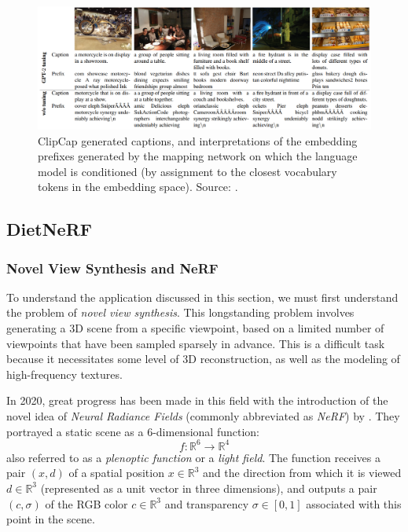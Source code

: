 \documentclass{article}
\begin{document}
\begin{figure}[ht!]
    \begin{center}
        \includegraphics[width=1.0\textwidth]{figures/clipcap_interpretations.png}
    \end{center}
    \caption{
        ClipCap generated captions, and interpretations of the embedding prefixes generated by the mapping network on which the language model is conditioned (by assignment to the closest vocabulary tokens in the embedding space). Source: \citet{mokady2021clipcap}.
    }
    \label{fig:clipcap_interpretations}
\end{figure}



\subsection{DietNeRF}
\label{sec:dietnerf}

\subsubsection{Novel View Synthesis and NeRF}
\label{subsec:nerf}

To understand the application discussed in this section, we must first understand the problem of \emph{novel view synthesis}. This longstanding problem involves generating a 3D scene from a specific viewpoint, based on a limited number of viewpoints that have been sampled sparsely in advance. This is a difficult task because it necessitates some level of 3D reconstruction, as well as the modeling of high-frequency textures.

\medskip
\noindent
In 2020, great progress has been made in this field with the introduction of the novel idea of \emph{Neural Radiance Fields} (commonly abbreviated as \emph{NeRF}) by \citet{mildenhall2020nerf}. They portrayed a static scene as a 6-dimensional function:
\begin{equation*}
    f: \mathbb{R}^6 \rightarrow \mathbb{R}^4
\end{equation*}
also referred to as a \emph{plenoptic function} or a \emph{light field}. The function receives a pair $(x,d)$ of a spatial position $x \in \mathbb{R}^3$ and the direction from which it is viewed $d \in \mathbb{R}^3$ (represented as a unit vector in three dimensions), and outputs a pair $(c,\sigma)$ of the RGB color $c \in \mathbb{R}^3$ and transparency $\sigma \in [0,1]$ associated with this point in the scene.
\end{document}
